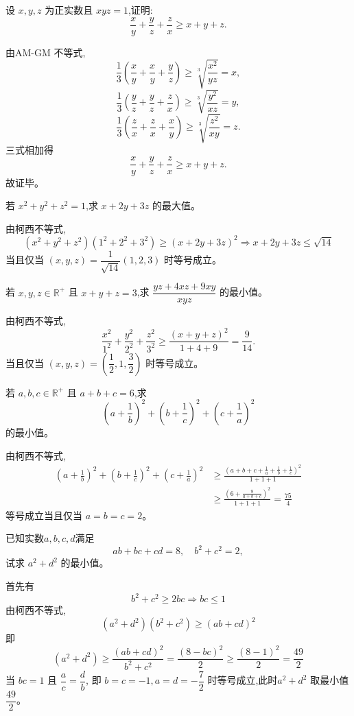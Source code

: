 \begin{questions}
    \question 设 \(x, y, z\) 为正实数且 \(xyz = 1\),证明:
    \[
    \frac{x}{y} + \frac{y}{z} + \frac{z}{x} \geq x + y + z.
    \]
    \begin{solution}
        由AM-GM 不等式,
        \[
        \frac{1}{3} \left( \frac{x}{y} + \frac{x}{y} + \frac{y}{z} \right) \geq \sqrt[3]{\frac{x^2}{yz}} = x,
        \]
        \[
        \frac{1}{3} \left( \frac{y}{z} + \frac{y}{z} + \frac{z}{x} \right) \geq \sqrt[3]{\frac{y^2}{xz}} = y, 
        \]
        \[
        \frac{1}{3} \left( \frac{z}{x} + \frac{z}{x} + \frac{x}{y} \right) \geq \sqrt[3]{\frac{z^2}{xy}} = z. 
        \]
        三式相加得
        \[
        \frac{x}{y} + \frac{y}{z} + \frac{z}{x} \geq x + y + z.
        \]
        故证毕。
    \end{solution}
    
    \question 若 $x^2+y^2+z^2=1$,求 $x+2y+3z$ 的最大值。
    \begin{solution}
        由柯西不等式,
        \[
        (x^2+y^2+z^2)(1^2+2^2+3^2) \ge (x+2y+3z)^2
        \Rightarrow x+2y+3z \le \sqrt{14}
        \]
        当且仅当 $(x,y,z)=\dfrac{1}{\sqrt{14}}(1,2,3)$ 时等号成立。
    \end{solution}

    \question 若 $x,y,z \in \mathbb{R}^+$ 且 $x+y+z=3$,求 $\dfrac{yz+4xz+9xy}{xyz}$ 的最小值。
    \begin{solution}
        由柯西不等式,
        \[
        \frac{x^2}{1^2} + \frac{y^2}{2^2} + \frac{z^2}{3^2} \ge \frac{(x+y+z)^2}{1+4+9} = \frac{9}{14}.
        \]
        当且仅当 $(x,y,z)=\left(\dfrac{1}{2},1,\dfrac{3}{2}\right)$ 时等号成立。
    \end{solution}

    \question 若 $a,b,c \in \mathbb{R}^+$ 且 $a+b+c=6$,求
    \[
    \left(a+\frac{1}{b}\right)^2 + \left(b+\frac{1}{c}\right)^2 + \left(c+\frac{1}{a}\right)^2
    \]
    的最小值。
    \begin{solution}
        由柯西不等式,
        \begin{align*}
        \left(a+\frac{1}{b}\right)^2 + \left(b+\frac{1}{c}\right)^2 + \left(c+\frac{1}{a}\right)^2 
        &\ge \frac{\left(a+b+c + \frac{1}{a}+\frac{1}{b}+\frac{1}{c}\right)^2}{1+1+1} \\
        &\ge \frac{\left(6 + \frac{9}{a+b+c}\right)^2}{1+1+1} = \frac{75}{4}
        \end{align*}
        等号成立当且仅当 $a=b=c=2$。
    \end{solution}

    \question 已知实数$a,b,c,d$满足 
    \[
    ab + bc + cd = 8,\quad b^{2} + c^{2} = 2,
    \]
    试求 $a^{2} + d^{2}$ 的最小值。
    \begin{solution}
        首先有
        \[
        b^2+c^2 \ge 2bc \Rightarrow bc \le 1
        \]
        由柯西不等式,
        \[ 
        (a^2+d^2)(b^2+c^2) \ge (ab+cd)^2 
        \]
        即
        \[ 
        (a^2+d^2) \ge \frac{(ab+cd)^2}{b^2+c^2} = \frac{(8-bc)^2}{2} \ge \frac{(8-1)^2}{2} = \frac{49}{2} 
        \]
        当 $bc=1$ 且 $\dfrac{a}{c} = \dfrac{d}{b}$, 即 $b=c=-1,a=d=-\dfrac{7}{2}$ 时等号成立,此时$a^2+d^2$ 取最小值 $\dfrac{49}{2}$。
    \end{solution}


\end{questions}

